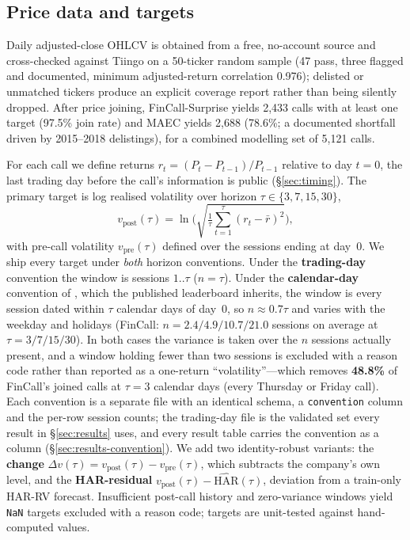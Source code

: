 \subsection{Price data and targets}
\label{sec:targets}
Daily adjusted-close OHLCV is obtained from a free, no-account source and
cross-checked against Tiingo on a 50-ticker random sample (47 pass, three flagged
and documented, minimum adjusted-return correlation 0.976); delisted or unmatched tickers produce an explicit coverage report rather
than being silently dropped. After price joining, FinCall-Surprise yields 2{,}433
calls with at least one target (97.5\% join rate) and MAEC yields 2{,}688 (78.6\%; a
documented shortfall driven by 2015--2018 delistings), for a combined modelling set
of 5{,}121 calls.

For each call we define returns $r_t = (P_t - P_{t-1})/P_{t-1}$ relative to day
$t=0$, the last trading day before the call's information is public
(\S\ref{sec:timing}). The primary target is log realised volatility over horizon
$\tau \in \{3,7,15,30\}$,
\begin{equation}
  v_{\mathrm{post}}(\tau) = \ln\!\Big(\sqrt{\tfrac{1}{\tau}\textstyle\sum_{t=1}^{\tau}(r_t-\bar r)^2}\Big),
\end{equation}
with pre-call volatility $v_{\mathrm{pre}}(\tau)$ defined over the sessions
ending at day~0. We ship every target under \emph{both} horizon conventions. Under
the \textbf{trading-day} convention the window is sessions $1..\tau$ ($n=\tau$).
Under the \textbf{calendar-day} convention of \citet{qin2019what}, which the
published leaderboard inherits, the window is every session dated within $\tau$
calendar days of day~0, so $n \approx 0.7\tau$ and varies with the weekday and
holidays (FinCall: $n = 2.4 / 4.9 / 10.7 / 21.0$ sessions on average at
$\tau = 3/7/15/30$). In both cases the variance is taken over the $n$ sessions
actually present, and a window holding fewer than two sessions is excluded with a
reason code rather than reported as a one-return ``volatility''---which removes
\textbf{48.8\%} of FinCall's joined calls at $\tau{=}3$ calendar days (every
Thursday or Friday call). Each convention is a separate file with an identical
schema, a \texttt{convention} column and the per-row session counts; the
trading-day file is the validated set every result in \S\ref{sec:results} uses,
and every result table carries the convention as a column
(\S\ref{sec:results-convention}). We add two identity-robust variants: the \textbf{change} $\Delta v(\tau) = v_{\mathrm{post}}(\tau)
- v_{\mathrm{pre}}(\tau)$, which subtracts the company's own level, and the
\textbf{HAR-residual} $v_{\mathrm{post}}(\tau) - \widehat{\mathrm{HAR}}(\tau)$,
deviation from a train-only HAR-RV \citep{corsi2009har} forecast. Insufficient
post-call history and zero-variance windows yield \texttt{NaN} targets excluded with
a reason code; targets are unit-tested against hand-computed values.

